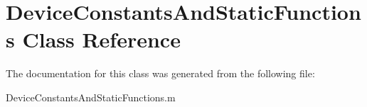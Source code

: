 \hypertarget{class_device_constants_and_static_functions}{\section{Device\-Constants\-And\-Static\-Functions Class Reference}
\label{class_device_constants_and_static_functions}
}


The documentation for this class was generated from the following file\-:\begin{DoxyCompactItemize}
\item 
Device\-Constants\-And\-Static\-Functions.\-m\end{DoxyCompactItemize}
